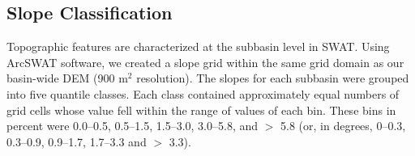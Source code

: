 \subsection{Slope Classification}\label{sec:slope}

Topographic features are characterized at the subbasin level in SWAT. 
Using ArcSWAT software, we created a slope grid within the same grid domain as our basin-wide DEM (900 m$^2$ resolution). 
The slopes for each subbasin were grouped into five quantile classes.
Each class contained approximately equal numbers of grid cells whose value fell within the range of values of each bin. 
These bins in percent were 0.0--0.5, 0.5--1.5, 1.5--3.0, 3.0--5.8, and $>$ 5.8 
(or, in degrees, 0--0.3, 0.3--0.9, 0.9--1.7, 1.7--3.3 and $>$ 3.3).
